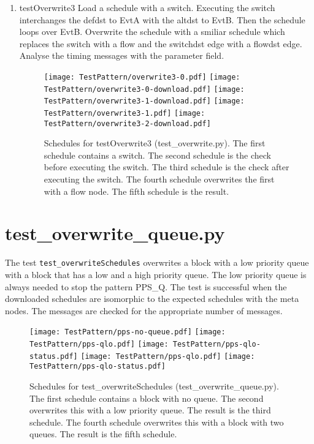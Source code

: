 \documentclass[12pt,a4paper]{report}
\begin{document}
\begin{enumerate}
\item testOverwrite3
    Load a schedule with a switch. Executing the switch interchanges
    the defdst to EvtA with the altdst to EvtB. Then the schedule loops
    over EvtB.
    Overwrite the schedule with a smiliar schedule which replaces the switch
    with a flow and the switchdst edge with a flowdst edge.
    Analyse the timing messages with the parameter field.
    \begin{figure}
        \centering
        \texttt{[image: TestPattern/overwrite3-0.pdf]}
        \texttt{[image: TestPattern/overwrite3-0-download.pdf]}
        \texttt{[image: TestPattern/overwrite3-1-download.pdf]}
        \texttt{[image: TestPattern/overwrite3-1.pdf]}
        \texttt{[image: TestPattern/overwrite3-2-download.pdf]}
        \caption{Schedules for testOverwrite3 (test\_overwrite.py). The first schedule
        contains a switch. The second schedule is the check before executing the
        switch. The third schedule is the check after executing the
        switch. The fourth schedule overwrites the first
        with a flow node. The fifth schedule is the result.}
        \label{fig:Schedules_for_testOverwrite3}
    \end{figure}

\end{enumerate}

\section{test\_overwrite\_queue.py}
The test \texttt{test\_overwriteSchedules} overwrites a block with a low priority
queue with a block that has a low and a high priority queue. The low priority
queue is always needed to stop the pattern PPS\_Q. The test is successful when
the downloaded schedules are isomorphic to the expected schedules with the
meta nodes. The messages are checked for the appropriate number of messages.
    \begin{figure}
        \centering
        \texttt{[image: TestPattern/pps-no-queue.pdf]}
        \texttt{[image: TestPattern/pps-qlo.pdf]}
        \texttt{[image: TestPattern/pps-qlo-status.pdf]}
        \texttt{[image: TestPattern/pps-qlo.pdf]}
        \texttt{[image: TestPattern/pps-qlo-status.pdf]}
        \caption{Schedules for test\_overwriteSchedules (test\_overwrite\_queue.py). The first schedule
        contains a block with no queue. The second overwrites this with a low priority queue.
        The result is the third schedule. The fourth schedule overwrites this with a block with
        two queues. The result is the fifth schedule.}
        \label{fig:Schedules_for_test_overwriteSchedules}
    \end{figure}
\end{document}
